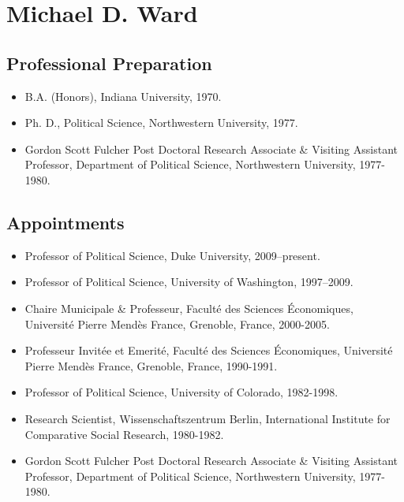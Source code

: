 \documentclass[pdftex,12pt,fullpage,oneside]{amsart}
\begin{document}
\newpage
\setcounter{page}{1}

 


\newpage
\setcounter{page}{1}


\section*{Michael D. Ward}
\subsection*{Professional Preparation}
\begin{itemize}
\item[]B.A. (Honors), Indiana University, 1970. 
\item[]Ph. D., Political Science, Northwestern University, 1977. 
\item[]Gordon Scott Fulcher Post Doctoral Research Associate \& Visiting Assistant Professor, Department of Political Science, Northwestern University, 1977-1980.
\end{itemize}
\subsection*{Appointments}
\begin{itemize}
\item[] Professor of Political Science, Duke University, 2009--present.
\item[] Professor of Political Science, University of Washington, 1997--2009.
\item[] Chaire Municipale \& Professeur, Facult\'{e} des Sciences \'{E}conomiques, Universit\'{e} Pierre Mend\`{e}s France, Grenoble, France, 2000-2005.
\item[] Professeur Invit\'{e}e et Emerit\'{e}, Facult\'{e} des Sciences \'{E}conomiques, Universit\'{e} Pierre Mend\`{e}s France, Grenoble, France, 1990-1991.
\item[] Professor of Political Science, University of Colorado, 1982-1998.
\item[] Research Scientist, Wissenschaftszentrum Berlin, International Institute for Comparative Social Research, 1980-1982.

\item[] Gordon Scott Fulcher Post Doctoral Research Associate \& Visiting Assistant Professor, Department of Political Science, Northwestern University, 1977-1980.
\end{itemize}
\end{document}
